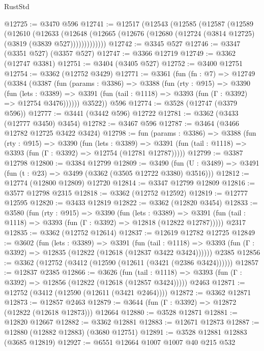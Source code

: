 \begin{lexlean}{RustStd}
\begin{coremodule}
@12725 := @3470 @596
@12741 := @12517
    (@12543
      (@12585
        (@12587
          (@12589
            (@12610
              (@12633
                (@12648
                  (@12665 (@12676 (@12680 (@12724 (@3814 @12725) (@3819 (@3839 @527)))))))))))))
@12742 := @3345 @527
@12746 := @3347 (@3351 @527) (@3357 @527)
@12747 := @3366 @12719
@12749 := @3362 (@12747 @3381)
@12751 := @3404 (@3405 @527)
@12752 := @3400 @12751
@12754 := @3362 (@12752 @3429)
@12771 := @3361
    (fun (fn : @7) =>
    @12749
      (@3384
        (@3387
          (fun (params : @3386) =>
          @3388
            (fun (rty : @915) =>
            @3390
              (fun (lets : @3389) =>
              @3391 (fun (tail : @1118) => @3393 (fun (Γ : @3392) => @12754 @3476))))))
        @3522))
    @596
@12774 := @3528 (@12747 (@3379 @596))
@12777 := @3441 (@3442 @596) @12722
@12781 := @3362 (@3433 (@12777 @3450) @3454)
@12782 := @3467 @596
@12787 := @3464 (@3466 @12782 @12725 @3422 @3424)
@12798 := fun (params : @3386) =>
  @3388
    (fun (rty : @915) =>
    @3390
      (fun (lets : @3389) =>
      @3391 (fun (tail : @1118) => @3393 (fun (Γ : @3392) => @12754 (@12781 @12787)))))
@12799 := @3387 @12798
@12800 := @3384 @12799
@12809 := @3490
    (fun (U : @3489) => @3491 (fun (t : @23) => @3499 (@3362 (@3505 @12722 @3380) @3516)))
@12812 := @12774 (@12800 @12809) @12720
@12814 := @3347 @12799 @12809
@12816 := @3577 @12798 @2315
@12818 := @3362 (@12752 @12592)
@12819 := @12777 @12595
@12820 := @3433 @12819
@12822 := @3362 (@12820 @3454)
@12833 := @3580
    (fun (rty : @915) =>
    @3390
      (fun (lets : @3389) =>
      @3391 (fun (tail : @1118) => @3393 (fun (Γ : @3392) => @12818 (@12822 @12787)))))
    @2317
@12835 := @3362 (@12752 @12614)
@12837 := @12619 @12782 @12725
@12849 := @3602
    (fun (lets : @3389) =>
    @3391
      (fun (tail : @1118) =>
      @3393 (fun (Γ : @3392) => @12835 (@12822 (@12618 (@12837 @3422 @3424))))))
    @2385
@12856 := @3362 (@12752 (@3412 (@12590 (@12611 (@3421 (@2386 @3424))))))
@12857 := @12837 @2385
@12866 := @3626
    (fun (tail : @1118) => @3393 (fun (Γ : @3392) => @12856 (@12822 (@12618 (@12857 @3424)))))
    @2463
@12871 := @12752 (@3412 (@12590 (@12611 (@3421 @2464))))
@12872 := @3362 @12871
@12873 := @12857 @2463
@12879 := @3644 (fun (Γ : @3392) => @12872 (@12822 (@12618 @12873))) @12664
@12880 := @3528 @12871
@12881 := @12820 @12667
@12882 := @3362 @12881
@12883 := @12671 @12873
@12887 := @12880 (@12882 @12883) (@3680 @12751)
@12891 := @3528 @12881 @12883 (@3685 @12819)
@12927 := @6551
    @12664
    @1007
    @1007
    @40
    @215
    @532

\end{coremodule}
\end{lexlean}
